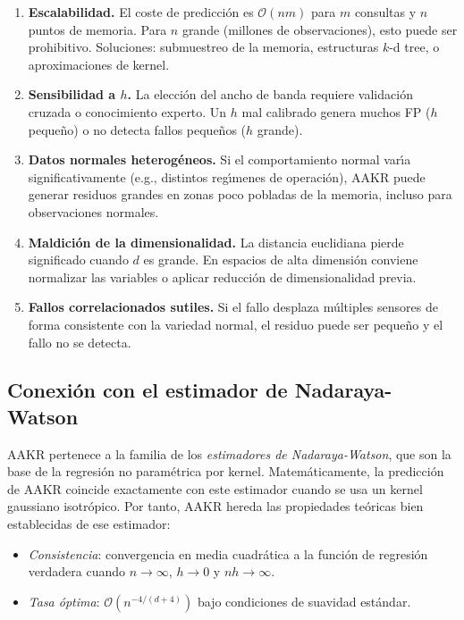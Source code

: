 \documentclass[12pt,a4paper]{article}
\begin{document}
\begin{enumerate}[leftmargin=2em]
  \item \textbf{Escalabilidad.} El coste de predicci\'on es $\mathcal{O}(nm)$ para
        $m$ consultas y $n$ puntos de memoria. Para $n$ grande (millones de
        observaciones), esto puede ser prohibitivo. Soluciones: submuestreo de la
        memoria, estructuras $k$-d tree, o aproximaciones de kernel.

  \item \textbf{Sensibilidad a $h$.} La elecci\'on del ancho de banda requiere
        validaci\'on cruzada o conocimiento experto. Un $h$ mal calibrado genera
        muchos FP ($h$ peque\~no) o no detecta fallos peque\~nos ($h$ grande).

  \item \textbf{Datos normales heterog\'eneos.} Si el comportamiento normal var\'{\i}a
        significativamente (e.g., distintos reg\'{\i}menes de operaci\'on), AAKR puede
        generar residuos grandes en zonas poco pobladas de la memoria, incluso para
        observaciones normales.

  \item \textbf{Maldici\'on de la dimensionalidad.} La distancia euclidiana pierde
        significado cuando $d$ es grande. En espacios de alta dimensi\'on conviene
        normalizar las variables o aplicar reducci\'on de dimensionalidad previa.

  \item \textbf{Fallos correlacionados sutiles.} Si el fallo desplaza m\'ultiples
        sensores de forma consistente con la variedad normal, el residuo puede ser
        peque\~no y el fallo no se detecta.
\end{enumerate}

\subsection{Conexi\'on con el estimador de Nadaraya-Watson}

AAKR pertenece a la familia de los \emph{estimadores de Nadaraya-Watson}, que son
la base de la regresi\'on no param\'etrica por kernel. Matem\'aticamente, la
predicci\'on de AAKR coincide exactamente con este estimador cuando se usa un
kernel gaussiano isotr\'opico. Por tanto, AAKR hereda las propiedades te\'oricas
bien establecidas de ese estimador:
\begin{itemize}[leftmargin=2em]
  \item \emph{Consistencia}: convergencia en media cuadr\'atica a la funci\'on de
        regresi\'on verdadera cuando $n \to \infty$, $h \to 0$ y $nh \to \infty$.
  \item \emph{Tasa \'optima}: $\mathcal{O}(n^{-4/(d+4)})$ bajo condiciones de
        suavidad est\'andar.
\end{itemize}
\end{document}
